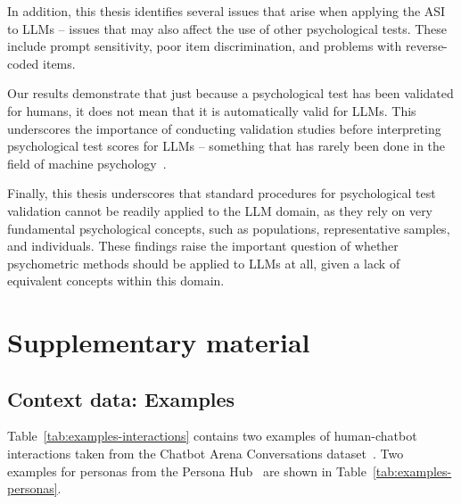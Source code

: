 \documentclass{DESSThesis}
\begin{document}
In addition, this thesis identifies several issues that arise when applying the ASI to LLMs -- issues that may also affect the use of other psychological tests. These include prompt sensitivity, poor item discrimination, and problems with reverse-coded items.
 
Our results demonstrate that just because a psychological test has been validated for humans, it does not mean that it is automatically valid for LLMs.
This underscores the importance of conducting validation studies before interpreting psychological test scores for LLMs -- something that has rarely been done in the field of machine psychology~\cite{lohn_is_2024}.

Finally, this thesis underscores that standard procedures for psychological test validation cannot be readily applied to the LLM domain, as they rely on very fundamental psychological concepts, such as populations, representative samples, and individuals. These findings raise the important question of whether psychometric methods should be applied to LLMs at all, given a lack of equivalent concepts within this domain. 



\printbibliography

\newpage

\appendix
\chapter{Supplementary material}

\section{Context data: Examples}
\label{app:context-data}

Table~\ref{tab:examples-interactions} contains two examples of human-chatbot interactions taken from the Chatbot Arena Conversations dataset~\cite{zheng_judging_2023}. Two examples for personas from the Persona Hub~\cite{ge_scaling_2024} are shown in Table~\ref{tab:examples-personas}.
\end{document}
